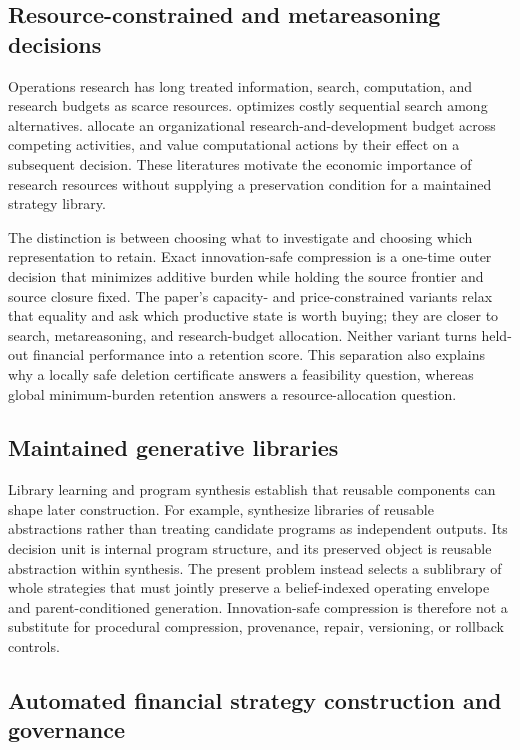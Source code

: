 \subsection{Resource-constrained and metareasoning decisions}

Operations research has long treated information, search, computation, and
research budgets as scarce resources. \citet{Weitzman1979} optimizes costly
sequential search among alternatives. \citet{BakerEtAl1976} allocate an
organizational research-and-development budget across competing activities,
and \citet{RussellWefald1991} value computational actions by their effect on a
subsequent decision. These literatures motivate the economic importance of
research resources without supplying a preservation condition for a maintained
strategy library.

The distinction is between choosing what to investigate and choosing which
representation to retain. Exact innovation-safe compression is a one-time
outer decision that minimizes additive burden while holding the source
frontier and source closure fixed. The paper's capacity- and price-constrained
variants relax that equality and ask which productive state is worth buying;
they are closer to search, metareasoning, and research-budget allocation.
Neither variant turns held-out financial performance into a retention score.
This separation also explains why a locally safe deletion certificate answers
a feasibility question, whereas global minimum-burden retention answers a
resource-allocation question.

\subsection{Maintained generative libraries}

Library learning and program synthesis establish that reusable components can
shape later construction. For example, \citet{BowersEtAl2023} synthesize
libraries of reusable abstractions rather than treating candidate programs as
independent outputs. Its decision unit is internal program structure, and its
preserved object is reusable abstraction within synthesis. The present problem
instead selects a sublibrary of whole strategies that must jointly preserve a
belief-indexed operating envelope and parent-conditioned generation.
Innovation-safe compression is therefore not a substitute for procedural
compression, provenance, repair, versioning, or rollback controls.

\subsection{Automated financial strategy construction and governance}

